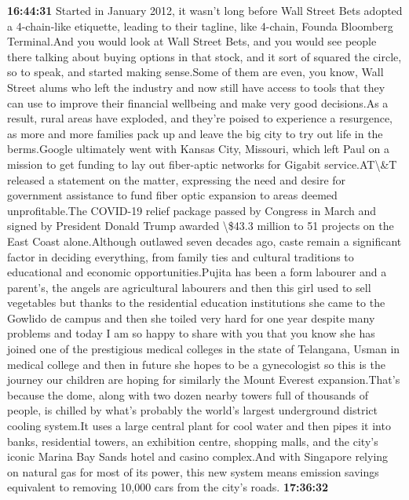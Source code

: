 \documentclass{article}%
\begin{document}
\textbf{16:44:31}%
\newline%
Started in January 2012, it wasn't long before Wall Street Bets adopted a 4{-}chain{-}like etiquette, leading to their tagline, like 4{-}chain, Founda Bloomberg Terminal.And you would look at Wall Street Bets, and you would see people there talking about buying options in that stock, and it sort of squared the circle, so to speak, and started making sense.Some of them are even, you know, Wall Street alums who left the industry and now still have access to tools that they can use to improve their financial wellbeing and make very good decisions.As a result, rural areas have exploded, and they're poised to experience a resurgence, as more and more families pack up and leave the big city to try out life in the berms.Google ultimately went with Kansas City, Missouri, which left Paul on a mission to get funding to lay out fiber{-}aptic networks for Gigabit service.AT\textbackslash{}\&T released a statement on the matter, expressing the need and desire for government assistance to fund fiber optic expansion to areas deemed unprofitable.The COVID{-}19 relief package passed by Congress in March and signed by President Donald Trump awarded \textbackslash{}\$43.3 million to 51 projects on the East Coast alone.Although outlawed seven decades ago, caste remain a significant factor in deciding everything, from family ties and cultural traditions to educational and economic opportunities.Pujita has been a form labourer and a parent's, the angels are agricultural labourers and then this girl used to sell vegetables but thanks to the residential education institutions she came to the Gowlido de campus and then she toiled very hard for one year despite many problems and today I am so happy to share with you that you know she has joined one of the prestigious medical colleges in the state of Telangana, Usman in medical college and then in future she hopes to be a gynecologist so this is the journey our children are hoping for similarly the Mount Everest expansion.That's because the dome, along with two dozen nearby towers full of thousands of people, is chilled by what's probably the world's largest underground district cooling system.It uses a large central plant for cool water and then pipes it into banks, residential towers, an exhibition centre, shopping malls, and the city's iconic Marina Bay Sands hotel and casino complex.And with Singapore relying on natural gas for most of its power, this new system means emission savings equivalent to removing 10,000 cars from the city's roads.%
\textbf{17:36:32}%
\end{document}
